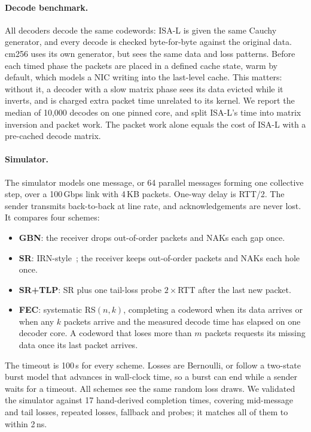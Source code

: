 \documentclass[10pt,twocolumn]{article}
\begin{document}
\paragraph{Decode benchmark.} All decoders decode the same codewords: ISA-L is given the same
Cauchy generator, and every decode is checked byte-for-byte against the original data. cm256 uses
its own generator, but sees the same data and loss patterns. Before each timed phase the packets
are placed in a defined cache state, warm by default, which models a NIC writing into the last-level
cache. This matters: without it, a decoder with a slow matrix phase sees its data evicted while it
inverts, and is charged extra packet time unrelated to its kernel. We report the median of 10{,}000
decodes on one pinned core, and split ISA-L's time into matrix inversion and packet work. The
packet work alone equals the cost of ISA-L with a pre-cached decode matrix.

\paragraph{Simulator.} The simulator models one message, or 64 parallel messages forming one
collective step, over a 100\,Gbps link with 4\,KB packets. One-way delay is RTT/2. The sender
transmits back-to-back at line rate, and acknowledgements are never lost. It compares four schemes:
\begin{itemize}
  \item \textbf{GBN}: the receiver drops out-of-order packets and NAKs each gap once.
  \item \textbf{SR}: IRN-style~\cite{irn}; the receiver keeps out-of-order packets and NAKs each hole once.
  \item \textbf{SR+TLP}: SR plus one tail-loss probe $2\times$RTT after the last new packet.
  \item \textbf{FEC}: systematic RS$(n,k)$, completing a codeword when its data arrives or when any
        $k$ packets arrive and the measured decode time has elapsed on one decoder core. A codeword
        that loses more than $m$ packets requests its missing data once its last packet arrives.
\end{itemize}
The timeout is 100\,\textmu s for every scheme. Losses are Bernoulli, or follow a two-state burst
model that advances in wall-clock time, so a burst can end while a sender waits for a timeout.
All schemes see the same random loss draws. We validated the simulator against 17 hand-derived
completion times, covering mid-message and tail losses, repeated losses, fallback and probes; it
matches all of them to within 2\,ns.
\end{document}
